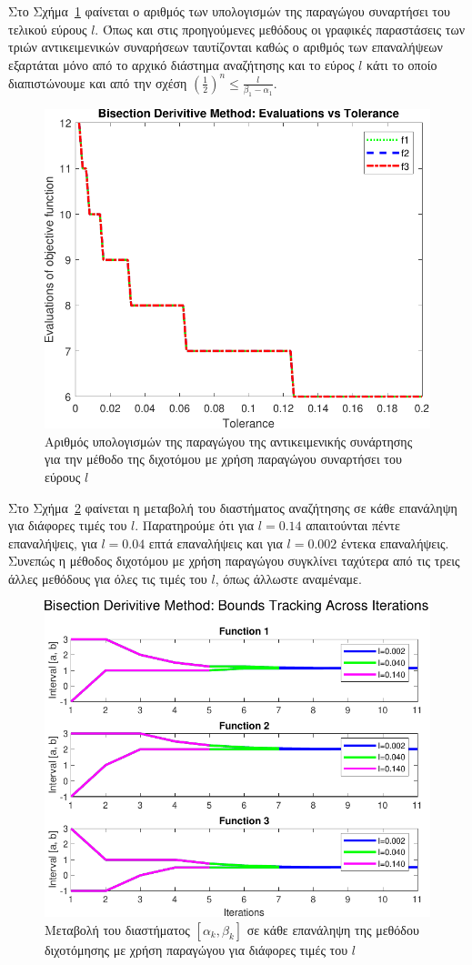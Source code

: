 \documentclass{article}
\begin{document}
Στο Σχήμα~\ref{fig:task4_plot1} φαίνεται ο αριθμός των υπολογισμών της παραγώγου συναρτήσει του τελικού εύρους $l$.
Όπως και στις προηγούμενες μεθόδους οι γραφικές παραστάσεις των τριών αντικειμενικών συναρήσεων ταυτίζονται
καθώς ο αριθμός των επαναλήψεων εξαρτάται μόνο από το αρχικό διάστημα αναζήτησης και το εύρος $l$ κάτι το οποίο
διαπιστώνουμε και από την σχέση $\left(\frac{1}{2}\right)^{n} \leq \frac{l}{\beta_1 - \alpha_1}$.

\begin{figure}
    \centering
    \includegraphics[width=0.75\linewidth]{plots/task4_plot1.pdf}
    \caption{Αριθμός υπολογισμών της παραγώγου της αντικειμενικής συνάρτησης για την μέθοδο της διχοτόμου με χρήση παραγώγου συναρτήσει του εύρους $l$}
    \label{fig:task4_plot1}
\end{figure}

Στο Σχήμα~\ref{fig:task4_plot2} φαίνεται η μεταβολή του διαστήματος αναζήτησης σε κάθε επανάληψη για διάφορες τιμές
του $l$. Παρατηρούμε ότι για $l = 0.14$ απαιτούνται πέντε επαναλήψεις, για $l = 0.04$ επτά επαναλήψεις και για 
$l = 0.002$ έντεκα επαναλήψεις. Συνεπώς η μέθοδος διχοτόμου με χρήση παραγώγου συγκλίνει ταχύτερα από τις τρεις
άλλες μεθόδους για όλες τις τιμές του $l$, όπως άλλωστε αναμέναμε.

\begin{figure}
    \centering
    \includegraphics[width=0.75\linewidth]{plots/task4_plot2.pdf}
    \caption{Μεταβολή του διαστήματος $[\alpha_k, \beta_k]$ σε κάθε επανάληψη της μεθόδου διχοτόμησης με χρήση παραγώγου για διάφορες τιμές του $l$}
    \label{fig:task4_plot2}
\end{figure}
\end{document}
